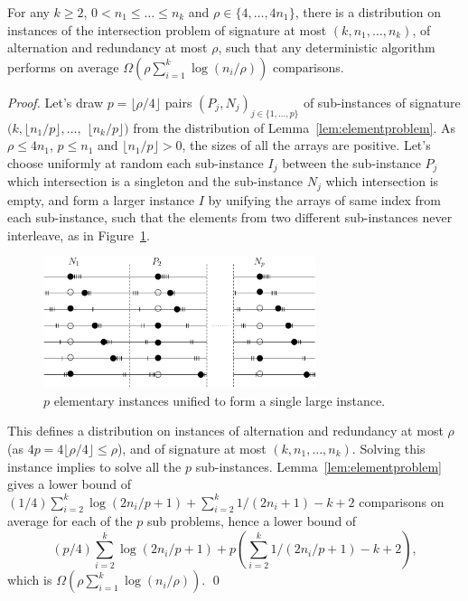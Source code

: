 %
\begin{lemma}\label{lem:generaldistribution}
For any $k\geq 2$, $0{<}n_1{\leq}\ldots{\leq}n_k$ and
$\rho{\in}\{4,\ldots,4n_1\}$, there is a distribution on instances of
the intersection problem of signature at most $(k,n_1,\ldots,n_k)$, of
alternation and redundancy at most $\rho$, such that any deterministic
algorithm performs on average $\Omega(\rho \sum_{i=1}^k \log(n_i/\rho))$ comparisons.
\end{lemma}
\begin{proof}
Let's draw $p{=}\lfloor\rho/4\rfloor$ pairs
$(P_j,N_j)_{j\in\{1,\ldots,p\}}$ of sub-instances of signature
$(k,\lfloor n_1/p\rfloor,\ldots,$ $\lfloor n_k/p\rfloor)$ from
the distribution of Lemma~\ref{lem:elementproblem}.
%
As $\rho\leq4n_1$, $p\leq n_1$ and $\lfloor n_1/p\rfloor>0$, the sizes
of all the arrays are positive.
%
Let's choose uniformly at random each sub-instance $I_j$ between the
sub-instance $P_j$ which intersection is a singleton and the
sub-instance $N_j$ which intersection is empty, and form a
larger instance $I$ by unifying the arrays of same index from each
sub-instance, such that the elements from two different sub-instances
never interleave, as in Figure~\ref{fig:generaldistribution}.
\begin{figure}
\centerline{\includegraphics[angle=0,width=8cm]{generaldistribution.eps}}
\caption{$p$ elementary instances unified to form a single large instance.}\label{fig:generaldistribution}
\end{figure}

This defines a distribution on instances of alternation and redundancy
at most $\rho$ (as $4p=4\lfloor\rho/4\rfloor\leq\rho$), and of
signature at most $(k,n_1,\ldots,n_k)$.
%
Solving this instance implies to solve all the $p$ sub-instances.
Lemma~\ref{lem:elementproblem} gives a lower bound of
$(1/4)\sum_{i=2}^k\log (2n_i/p+1)+\sum_{i=2}^k{1/(2n_i{+}1)}-k{+}2$
comparisons on average for each of the $p$ sub problems, hence a lower
bound of
%
$$(p/4)
  \sum_{i=2}^k   \log(2n_i/p+1)  
               +p\left( \sum_{i=2}^k { 1 / (2n_i/p{+}1) }
                                 -k{+}2
                 \right)
,$$
%
which is $\Omega(\rho\sum_{i=1}^k\log (n_i/\rho))$.  \qed\end{proof}
%



